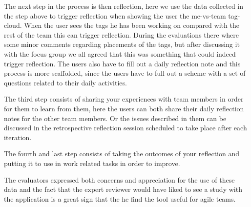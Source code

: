 The next step in the process is then reflection, here we use the data collected in the step above to trigger reflection when showing the user the me-vs-team tag-cloud. When the user sees the tags he has been working on compared with the rest of the team this can trigger reflection. During the evaluations there where some minor comments regarding placements of the tags, but after discussing it with the focus group we all agreed that this was something that could indeed trigger reflection. The users also have to fill out a daily reflection note and this process is more scaffolded, since the users have to full out a scheme with a set of questions related to their daily activities.

The third step consists of sharing your experiences with team members in order for them to learn from them, here the users can both share their daily reflection notes for the other team members. Or the issues described in them can be discussed in the retrospective reflection session scheduled to take place after each iteration.

The fourth and last step consists of taking the outcomes of your reflection and putting it to use in work related tasks in order to improve.

The evaluators expressed both concerns and appreciation for the use of these data and the fact that the expert reviewer would have liked to see a study with the application is a great sign that the he find the tool useful for agile teams.
